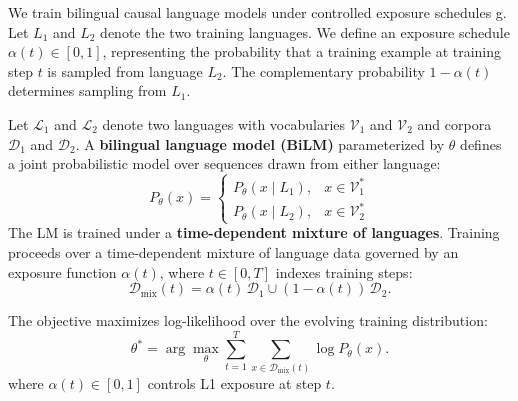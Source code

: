 
We train bilingual causal language models under controlled exposure schedules g. Let \( L_1 \) and \( L_2 \) denote the two training languages. We define an exposure schedule \( \alpha(t) \in [0,1] \), representing the probability that a training example at training step \( t \) is sampled from language \( L_2 \). The complementary probability \( 1-\alpha(t) \) determines sampling from \( L_1 \).


 

Let $\mathcal{L}_1$ and $\mathcal{L}_2$ denote two languages with vocabularies $\mathcal{V}_1$ and $\mathcal{V}_2$ and corpora $\mathcal{D}_1$ and $\mathcal{D}_2$. A \textbf{bilingual language model (BiLM)} parameterized by $\theta$ defines a joint probabilistic model over sequences drawn from either language:
\[
P_\theta(x) =
\begin{cases}
P_\theta(x \mid L_1), & x \in \mathcal{V}_1^* \\
P_\theta(x \mid L_2), & x \in \mathcal{V}_2^*
\end{cases}
\]
The LM is trained under a\textbf{ time-dependent mixture of languages}. Training proceeds over a time-dependent mixture of language data governed by an exposure function $\alpha(t)$, where $t \in [0,T]$ indexes training steps:
\[
\mathcal{D}_{\text{mix}}(t) = \alpha(t)\,\mathcal{D}_1 \cup (1-\alpha(t))\,\mathcal{D}_2.
\]

The objective maximizes log-likelihood over the evolving training distribution:
\[
\theta^* = \arg\max_\theta \sum_{t=1}^{T} \sum_{x \in \mathcal{D}_{\text{mix}}(t)} \log P_\theta(x).
\]
where $\alpha(t) \in [0,1]$ controls L1 exposure at step $t$.



